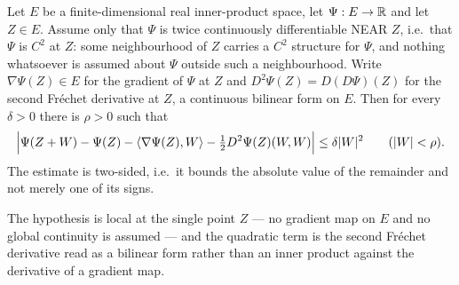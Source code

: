 \begin{lemma}
Let $E$ be a finite-dimensional real inner-product space, let $\Psi:E\to\mathbb{R}$ and
let $Z\in E$. Assume only that $\Psi$ is twice continuously differentiable NEAR
$Z$, i.e.\ that $\Psi$ is $C^2$ at $Z$: some neighbourhood of $Z$ carries a
$C^2$ structure for $\Psi$, and nothing whatsoever is assumed about $\Psi$
outside such a neighbourhood. Write $\nabla\Psi(Z)\in E$ for the gradient of
$\Psi$ at $Z$ and $D^2\Psi(Z)=D(D\Psi)(Z)$ for the second Fr\'echet derivative
at $Z$, a continuous bilinear form on $E$. Then for every $\delta>0$ there is
$\rho>0$ such that
\[
  \Bigl|\Psi(Z+W)-\Psi(Z)-\langle\nabla\Psi(Z),W\rangle
    -\tfrac12D^2\Psi(Z)(W,W)\Bigr|\le\delta|W|^2\qquad(|W|<\rho).
\]
The estimate is two-sided, i.e.\ it bounds the absolute value of the remainder
and not merely one of its signs.

The hypothesis is local at the single point $Z$ --- no gradient map on $E$ and no
global continuity is assumed --- and the quadratic term is the second Fr\'echet
derivative read as a bilinear form rather than an inner product against the
derivative of a gradient map.
\end{lemma}
